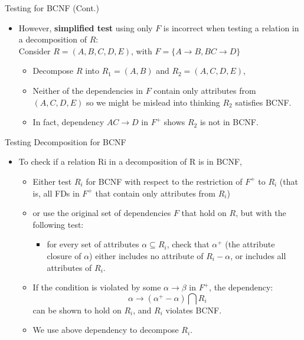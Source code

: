 \documentclass{beamer}
\begin{document}
\begin{frame}{Testing for BCNF (Cont.)}
    \footnotesize
    \begin{itemize}
        \item However, \textbf{simplified test} using only $F$ is incorrect when testing a relation in a decomposition of $R$:\\
            Consider $R = (A, B, C, D, E)$, with $F = \{ A \rightarrow B, BC \rightarrow D \}$
            \begin{itemize}
                \item Decompose $R$ into $R_1 = (A,B)$ and $R_2 = (A,C,D,E)$,
                \item Neither of the dependencies in $F$ contain only attributes from $(A,C,D,E)$ so we might be mislead into thinking $R_2$ satisfies BCNF.
                \item In fact, dependency $AC \rightarrow D$ in $F^+$ shows $R_2$ is not in BCNF.
            \end{itemize}
    \end{itemize}
\end{frame}

\begin{frame}{Testing Decomposition for BCNF}
    \begin{itemize}
        \item To check if a relation Ri in a decomposition of R is in BCNF,
            \begin{itemize}
                \item Either test $R_i$ for BCNF with respect to the restriction of $F^+$ to $R_i$ (that is, all FDs in $F^+$ that contain only attributes from $R_i$)
                \item or use the original set of dependencies $F$ that hold on $R$, but with the following test:
                    \begin{itemize}
                        \item for every set of attributes $\alpha \subseteq R_i$, check that $\alpha^+$ (the attribute closure of $\alpha$) either includes no attribute of $R_i - \alpha$, or includes all attributes of $R_i$.
                    \end{itemize}
                \item If the condition is violated by some $\alpha \rightarrow \beta$ in $F^+$, the dependency:
                    $$
                        \alpha \rightarrow (\alpha^+ - \alpha) \bigcap R_i
                    $$
                    can be shown to hold on $R_i$, and $R_i$ violates BCNF.
                \item We use above dependency to decompose $R_i$.
            \end{itemize}
    \end{itemize}
\end{frame}
\end{document}
